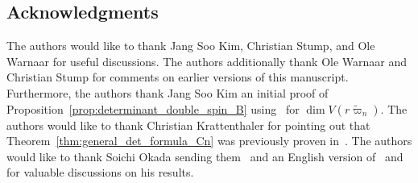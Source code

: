 \documentclass[11pt, leqno]{amsart}
\theoremstyle{plain}
\theoremstyle{definition}
\numberwithin{equation}{section}
\newcommand{\fw}{\varpi} %
\newcommand{\tfw}{\widetilde{\fw}} %
\newcommand{\ps}{\operatorname{ps}} %
\newcommand{\nps}{\widetilde{\ps}} %
\newcommand{\Fixme}[1]{\todo[size=\tiny,inline,color=red!30]{#1
      \\ \hfill --- Fix me}}
\begin{document}



\subsection*{Acknowledgments}

The authors would like to thank Jang Soo Kim, Christian Stump, and Ole Warnaar for useful discussions.
The authors additionally thank Ole Warnaar and Christian Stump for comments on earlier versions of this manuscript.
Furthermore, the authors thank Jang Soo Kim an initial proof of Proposition~\ref{prop:determinant_double_spin_B} using~\cite[Lemma 3.3]{BKW16} for $\dim V(r\tfw_n)$.
The authors would like to thank Christian Krattenthaler for pointing out that Theorem~\ref{thm:general_det_formula_Cn} was previously proven in~\cite{Okada89}.
The authors would like to thank Soichi Okada sending them~\cite{Okada89} and an English version of~\cite{Okada09} and for valuable discussions on his results.
\end{document}
